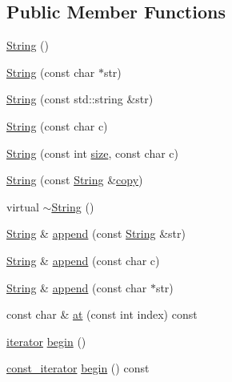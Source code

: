 \subsection*{Public Member Functions}
\begin{DoxyCompactItemize}
\item 
\hyperlink{classprism_1_1_string_a3a9df9dd5d297b91d2eec1ef7c4db8d3}{String} ()
\item 
\hyperlink{classprism_1_1_string_ad273f297c9125493c40876e368347fbf}{String} (const char $\ast$str)
\item 
\hyperlink{classprism_1_1_string_aedf9c8008bc992012ed8dea7b312683c}{String} (const std\+::string \&str)
\item 
\hyperlink{classprism_1_1_string_aa60f6e3b928d3072c204deba612dec65}{String} (const char c)
\item 
\hyperlink{classprism_1_1_string_ac14b5c78edff344d549496eba0b226c5}{String} (const int \hyperlink{classprism_1_1_string_a603b5a90681d43adf7c6c29018e0300c}{size}, const char c)
\item 
\hyperlink{classprism_1_1_string_a6734cae1e3f2165a4a5d1f48cb56d0fe}{String} (const \hyperlink{classprism_1_1_string}{String} \&\hyperlink{namespaceprism_ae776f4cd825f79e7af1cf6ee1d90a209}{copy})
\item 
virtual \hyperlink{classprism_1_1_string_ab0114c8ba868b0facea3286d2764f010}{$\sim$\+String} ()
\item 
\hyperlink{classprism_1_1_string}{String} \& \hyperlink{classprism_1_1_string_af3c09c0f82ab5d85c78da4735f80fd6a}{append} (const \hyperlink{classprism_1_1_string}{String} \&str)
\item 
\hyperlink{classprism_1_1_string}{String} \& \hyperlink{classprism_1_1_string_abd1d707fe07b1e9565b77cf86b2fa5f5}{append} (const char c)
\item 
\hyperlink{classprism_1_1_string}{String} \& \hyperlink{classprism_1_1_string_a730e94334cafe06fb1e7f6c608bd1677}{append} (const char $\ast$str)
\item 
const char \& \hyperlink{classprism_1_1_string_a55e86af07823ab80c1b6b0849231312b}{at} (const int index) const 
\item 
\hyperlink{classprism_1_1_string_adacc7975837e5fff95d70690777fb330}{iterator} \hyperlink{classprism_1_1_string_ae8f176fbe590422a3061552b8ed36ec5}{begin} ()
\item 
\hyperlink{classprism_1_1_string_a8b46f0fbe9c5c94ba892975242e3ab68}{const\+\_\+iterator} \hyperlink{classprism_1_1_string_ab3b18cfb5a3de6481f2f3d82bf5f0ef6}{begin} () const 

\end{DoxyCompactItemize}
